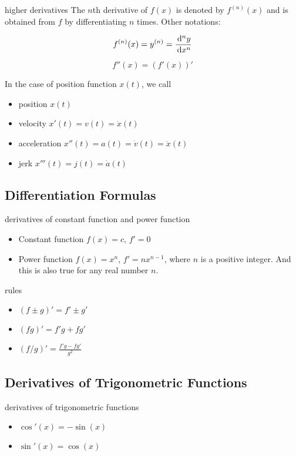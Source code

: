 \documentclass[Calculus 1 Recitation.tex]{subfiles}
\begin{document}
\begin{myleftlinebox}
	higher derivatives
	\tcblower
	The $n$th derivative of $f(x)$ is denoted by $f^{(n)}(x)$ and is obtained from $f$ by differentiating $n$ times. Other notations:

	\[f^{(n)}(x)=y^{(n)}=\frac{\,\mathrm{d}^n y}{\,\mathrm{d} x^n}\]

	\[f''(x)=(f'(x))'\]

	In the case of position function $x(t)$, we call
	\begin{itemize}
		\item position $x(t)$
		\item velocity $x'(t)=v(t)=\dot x(t)$
		\item acceleration $x''(t)=a(t)=\dot v(t)=\ddot x(t)$
		\item jerk $x'''(t)=j(t)=\dot a(t)$
	\end{itemize}
\end{myleftlinebox}

\subsection{Differentiation Formulas}

\begin{myleftlinebox}
	derivatives of constant function and power function
	\tcblower
	\begin{itemize}
		\item Constant function $f(x)=c$, $f'=0$
		\item Power function $f(x)=x^n$, $f'=nx^{n-1}$, where $n$ is a positive integer. And this is also true for any real number $n$.
	\end{itemize}
\end{myleftlinebox}

\begin{myleftlinebox}
	rules
	\tcblower
	\begin{itemize}
		\item $(f\pm g)'=f'\pm g'$
		\item $(fg)'=f'g+fg'$
		\item $(f/g)'=\frac{f'g-fg'}{g^2}$
	\end{itemize}
\end{myleftlinebox}

\subsection{Derivatives of Trigonometric Functions}

\begin{myleftlinebox}
	derivatives of trigonometric functions
	\tcblower
	\begin{itemize}
		\item $\cos'(x)=-\sin(x)$
		\item $\sin'(x)=\cos(x)$
	\end{itemize}
\end{myleftlinebox}
\end{document}
